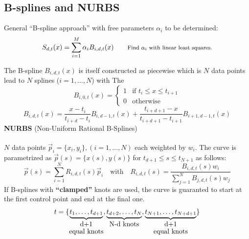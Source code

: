 \documentclass[8pt,a4paper]{scrartcl}
\begin{document}
\begin{multicols*}{3}
\subsection{B-splines and NURBS}

General ``B-spline approach'' with free parameters $\alpha_i$ to be determined:
\begin{equation*}
S_{d,t}(x) = \sum_{i=1}^M \alpha_i B_{i,d,t}(x)\qquad \text{\footnotesize Find $\alpha_i$ with linear least squares.\normalsize}
\end{equation*}


The B-spline $B_{i,d,t}(x)$ is itself constructed as piecewise  which is  $N$ data points lead to $N$ splines ($i=1,\dots,N$) with  The 
\begin{equation*}
B_{i,0,t}(x) =
\begin{cases}
1 & \text{if } t_i \le x \le t_{i+1}\\
0 & \text{otherwise}
\end{cases}
\end{equation*}
\begin{equation*}
B_{i,d,t}(x) = \frac{x-t_i}{t_{i+d}-t_i} B_{i,d-1,t}(x) + \frac{t_{i+d+1}-x}{t_{i+d+1}-t_{i+1}} B_{i+1,d-1,t}(x)
\end{equation*}
\textbf{NURBS} (Non-Uniform Rational B-Splines)\\ \\
$N$ data points $\vec p_i = \{ x_i,y_i \},  (i = 1,\dots,N)$ each weighted by $w_i$. The curve is parametrized as $\vec p (s) = \{x(s),y(s)\}$ for $t_{d+1} \le s \le t_{N+1}$ as follows:
\begin{equation*}
\vec p(s) = \sum_{i=1}^N R_{i,d,t}(s) \vec p_i  \quad \text{with} \quad R_{i,d,t}(s) = \frac{B_{i,d,t}(s) w_i}{\sum_{j=1}^N B_{j,d,t}(s) w_j}
\end{equation*}
If B-splines with \textbf{``clamped''} knots are used, the curve is guaranted to start at the first control point and end at the final one.
\begin{equation*}
t = \{ \underbrace{t_1,\dots,t_{d+1}}_{\shortstack{d+1 \\ equal knots}}, \underbrace{t_{d+2},\dots,t_N}_{\shortstack{N-d knots}}, \underbrace{t_{N+1},\dots,t_{N+d+1}}_{\shortstack{d+1 \\ equal knots}} \}
\end{equation*}


\end{multicols*}
\end{document}
